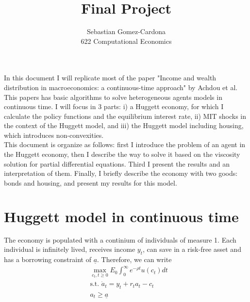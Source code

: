 \documentclass[12pt]{article}
\begin{document}
 
 
 
\title{Final Project}%
\author{Sebastian Gomez-Cardona\\ %
622 Computational Economics} %
 
\maketitle

In this document I will replicate most of the paper "Income and wealth distribution in macroeconomics: a continuous-time approach" by Achdou et al. This papers has basic algorithms to solve heterogeneous agents models in continuous time. I will focus in 3 parts: i) a Huggett economy, for which I calculate the policy functions and the equilibrium interest rate, ii) MIT shocks in the context of the Huggett model, and iii) the Huggett model including housing, which introduces non-convexities.\\
This document is organize as follows: first I introduce the problem of an agent in the Huggett economy, then I describe the way to solve it based on the viscosity solution for partial differential equations. Third I present the results and an interpretation of them. Finally, I briefly describe the economy with two goods: bonds and housing, and present my results for this model.\\

\section{Huggett model in continuous time}
The economy is populated with a continium of individuals of measure 1. Each individual is infinitely lived, receives income $y_t$, can save in a risk-free asset and has a borrowing constraint of $\underline{a}$. Therefore, we can write
\begin{equation}\label{eq1}
\begin{split}
&\max_{c_t, t\geq 0} E_0 \int_0^\infty e^{-\rho t} u(c_t) dt\\
&\text{s.t.      } \dot{a}_t=y_t+r_t a_t-c_t \\
&a_t\geq \underline{a}
\end{split}
\end{equation}
\end{document}
